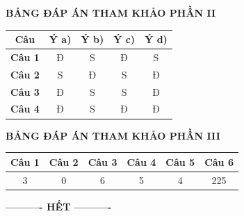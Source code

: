 \documentclass[12pt,a4paper]{article}
\begin{document}
\bigskip
\noindent\textbf{\large BẢNG ĐÁP ÁN THAM KHẢO PHẦN II}
\vspace{0.2cm}

\begin{center}
\begin{tabular}{|c|c|c|c|c|}
\hline
\textbf{Câu} & \textbf{Ý a)} & \textbf{Ý b)} & \textbf{Ý c)} & \textbf{Ý d)} \\
\hline
\textbf{Câu 1} & Đ & S & Đ & S \\
\hline
\textbf{Câu 2} & S & Đ & S & Đ \\
\hline
\textbf{Câu 3} & Đ & S & S & Đ \\
\hline
\textbf{Câu 4} & Đ & S & Đ & Đ \\
\hline
\end{tabular}
\end{center}

\bigskip
\noindent\textbf{\large BẢNG ĐÁP ÁN THAM KHẢO PHẦN III}
\vspace{0.2cm}

\begin{center}
\begin{tabular}{|c|c|c|c|c|c|}
\hline
\textbf{Câu 1} & \textbf{Câu 2} & \textbf{Câu 3} & \textbf{Câu 4} & \textbf{Câu 5} & \textbf{Câu 6} \\
\hline
3 & 0 & 6 & 5 & 4 & 225 \\
\hline
\end{tabular}
\end{center}

\bigskip
\begin{center}
\textbf{---------- HẾT ----------}
\end{center}
\end{document}
